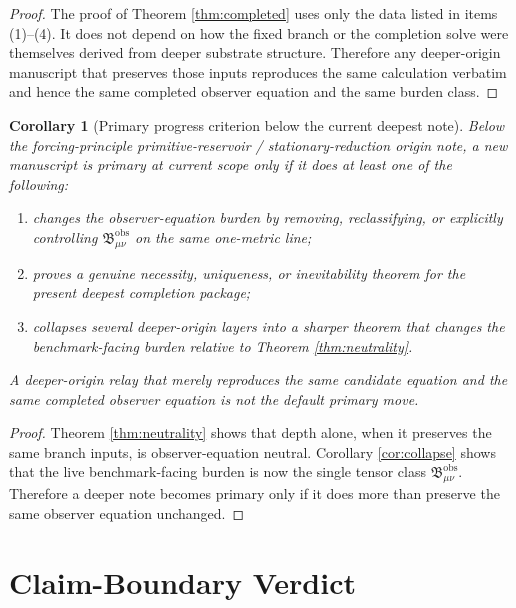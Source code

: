 \documentclass[11pt]{article}
\newcommand{\ObsBurden}{\mathfrak B_{\mu\nu}^{\mathrm{obs}}}
\newtheorem{corollary}{Corollary}
\begin{document}
\begin{proof}
The proof of Theorem \ref{thm:completed} uses only the data listed in items (1)--(4). It does not depend on how the fixed branch or the completion solve were themselves derived from deeper substrate structure. Therefore any deeper-origin manuscript that preserves those inputs reproduces the same calculation verbatim and hence the same completed observer equation and the same burden class.
\end{proof}

\begin{corollary}[Primary progress criterion below the current deepest note]
\label{cor:primary}
Below the forcing-principle primitive-reservoir / stationary-reduction origin note, a new manuscript is primary at current scope only if it does at least one of the following:
\begin{enumerate}
    \item changes the observer-equation burden by removing, reclassifying, or explicitly controlling \(\ObsBurden\) on the same one-metric line;
    \item proves a genuine necessity, uniqueness, or inevitability theorem for the present deepest completion package;
    \item collapses several deeper-origin layers into a sharper theorem that changes the benchmark-facing burden relative to Theorem \ref{thm:neutrality}.
\end{enumerate}
A deeper-origin relay that merely reproduces the same candidate equation and the same completed observer equation is not the default primary move.
\end{corollary}

\begin{proof}
Theorem \ref{thm:neutrality} shows that depth alone, when it preserves the same branch inputs, is observer-equation neutral. Corollary \ref{cor:collapse} shows that the live benchmark-facing burden is now the single tensor class \(\ObsBurden\). Therefore a deeper note becomes primary only if it does more than preserve the same observer equation unchanged.
\end{proof}

\section{Claim-Boundary Verdict}
\end{document}
